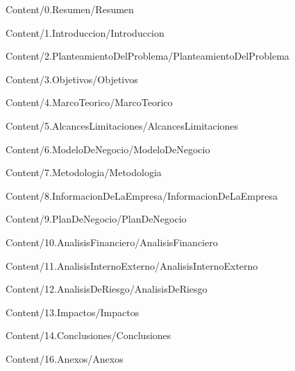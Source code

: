

\newpage
\tableofcontents
\newpage
\listoffigures
\newpage
\listoftables
\newpage

\justifying
\raggedbottom 


{Content/0.Resumen/Resumen}


{Content/1.Introduccion/Introduccion}


{Content/2.PlanteamientoDelProblema/PlanteamientoDelProblema}



{Content/3.Objetivos/Objetivos}



{Content/4.MarcoTeorico/MarcoTeorico}



{Content/5.AlcancesLimitaciones/AlcancesLimitaciones}



{Content/6.ModeloDeNegocio/ModeloDeNegocio}


{Content/7.Metodologia/Metodologia}



{Content/8.InformacionDeLaEmpresa/InformacionDeLaEmpresa}



{Content/9.PlanDeNegocio/PlanDeNegocio}



{Content/10.AnalisisFinanciero/AnalisisFinanciero}



{Content/11.AnalisisInternoExterno/AnalisisInternoExterno}



{Content/12.AnalisisDeRiesgo/AnalisisDeRiesgo}



{Content/13.Impactos/Impactos}



{Content/14.Conclusiones/Conclusiones}

\printbibliography[nottype=misc, title={Bibliografía}]
\printbibliography[type=misc,title={Referencias}]

{Content/16.Anexos/Anexos}
